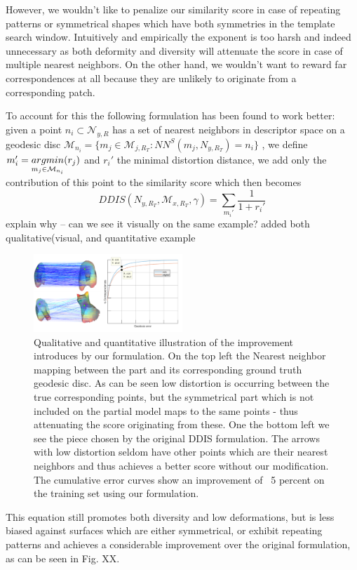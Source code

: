 \documentclass[10pt,twocolumn,letterpaper]{article}
\begin{document}
However, we wouldn't like to penalize our similarity score in case of repeating patterns or symmetrical shapes which have both symmetries in the template search window. Intuitively and empirically the exponent is too harsh and indeed unnecessary as both deformity and diversity will attenuate the score in case of multiple nearest neighbors. On the other hand, we wouldn't want to reward far correspondences at all because they are unlikely to originate from a corresponding patch. 



To account for this the following formulation has been found to work better: given a point $n_i\subset \mathcal{N}_{y,R}$ has a set of nearest neighbors in descriptor space on a geodesic disc 
$\mathcal{M}_{n_i}=\{m_j\in\mathcal{M}_{j,R_T}:NN^S(m_j,N_{y,R_T})=n_i\}$ 
, we define 
$m_i' = \underset{m_j\in\mathcal{M}_{n_i}}{argmin}\space (r_j)$
and $r_i'$ the minimal distortion distance, we add only the contribution of this point to the similarity score which then becomes
\begin{equation}
DDIS(N_{y,R_T},\mathcal{M}_{x,R_T},\gamma)=\sum_{m_i'}\frac{1}{1+r_i'}
\end{equation}
{\color{red} explain why -- can we see it visually on the same example?}{\color{green} added both qualitative(visual, and quantitative example}\\
\begin{figure}[htb]
	\includegraphics[width=0.5\textwidth]{figures/DDISvsWDIS.png}
	\caption{Qualitative and quantitative illustration of the improvement introduces by our formulation. On the top left the Nearest neighbor mapping between the part and its corresponding ground truth geodesic disc. As can be seen low distortion is occurring between the true corresponding points, but the symmetrical part which is not included on the partial model maps to the same points - thus attenuating the score originating from these. One the bottom left we see the piece chosen by the original DDIS formulation. The arrows with low distortion seldom have other points which are their nearest neighbors and thus achieves a better score without our modification. The cumulative error curves show an improvement of ~5 percent on the training set using our formulation.}
\end{figure}
This equation still promotes both diversity and low deformations, but is less biased against surfaces which are either symmetrical, or exhibit repeating patterns and achieves a considerable improvement over the original formulation, as can be seen in Fig. XX.
\end{document}
